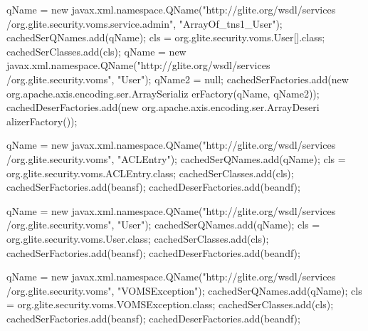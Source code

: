 \begin{DoxyCode}
{            qName = new javax.xml.namespace.QName("http://glite.org/wsdl/services
      /org.glite.security.voms.service.admin", "ArrayOf_tns1_User");
            cachedSerQNames.add(qName);
            cls = org.glite.security.voms.User[].class;
            cachedSerClasses.add(cls);
            qName = new javax.xml.namespace.QName("http://glite.org/wsdl/services
      /org.glite.security.voms", "User");
            qName2 = null;
            cachedSerFactories.add(new org.apache.axis.encoding.ser.ArraySerializ
      erFactory(qName, qName2));
            cachedDeserFactories.add(new org.apache.axis.encoding.ser.ArrayDeseri
      alizerFactory());

            qName = new javax.xml.namespace.QName("http://glite.org/wsdl/services
      /org.glite.security.voms", "ACLEntry");
            cachedSerQNames.add(qName);
            cls = org.glite.security.voms.ACLEntry.class;
            cachedSerClasses.add(cls);
            cachedSerFactories.add(beansf);
            cachedDeserFactories.add(beandf);

            qName = new javax.xml.namespace.QName("http://glite.org/wsdl/services
      /org.glite.security.voms", "User");
            cachedSerQNames.add(qName);
            cls = org.glite.security.voms.User.class;
            cachedSerClasses.add(cls);
            cachedSerFactories.add(beansf);
            cachedDeserFactories.add(beandf);

            qName = new javax.xml.namespace.QName("http://glite.org/wsdl/services
      /org.glite.security.voms", "VOMSException");
            cachedSerQNames.add(qName);
            cls = org.glite.security.voms.VOMSException.class;
            cachedSerClasses.add(cls);
            cachedSerFactories.add(beansf);
            cachedDeserFactories.add(beandf);

    }
\end{DoxyCode}


